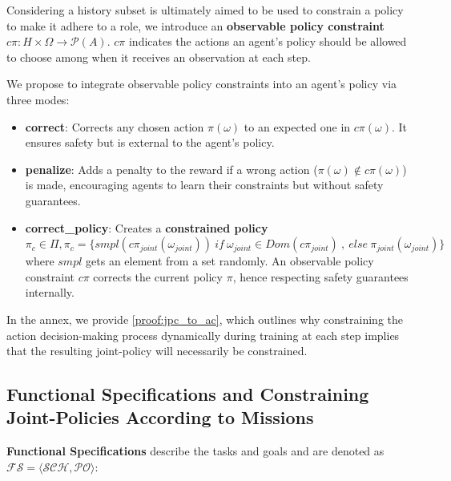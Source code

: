 \documentclass[runningheads]{llncs}
\theoremstyle{freethm}
\theoremstyle{proofoutline}
\newcounter{proof}
\begin{document}
Considering a history subset is ultimately aimed to be used to constrain a policy to make it adhere to a role, we introduce an \textbf{observable policy constraint} $c\pi: H \times \Omega \rightarrow \mathcal{P}(A)$. $c\pi$ indicates the actions an agent's policy should be allowed to choose among when it receives an observation at each step.

%     

We propose to integrate observable policy constraints into an agent's policy via three modes:

\begin{itemize}
    \item \textbf{correct}: Corrects any chosen action $\pi(\omega)$ to an expected one in $c\pi(\omega)$. It ensures safety but is external to the agent's policy.
    \item \textbf{penalize}: Adds a penalty to the reward if a wrong action ($\pi(\omega) \notin c\pi(\omega)$) is made, encouraging agents to learn their constraints but without safety guarantees.
    \item \textbf{correct\_policy}: Creates a \textbf{constrained policy} $\pi_c \in \Pi, \pi_c = \{smpl(c\pi_{joint}(\omega_{joint})) \ if \ \omega_{joint} \in Dom(c\pi_{joint}) \ \allowbreak, \ \allowbreak else \ \allowbreak \pi_{joint}(\omega_{joint})\}$ where $smpl$ gets an element from a set randomly. An observable policy constraint $c\pi$ corrects the current policy $\pi$, hence respecting safety guarantees internally.
\end{itemize}

In the annex, we provide \autoref{proof:jpc_to_ac}, which outlines why constraining the action decision-making process dynamically during training at each step implies that the resulting joint-policy will necessarily be constrained.


\subsection{Functional Specifications and Constraining Joint-Policies According to Missions}

\textbf{Functional Specifications} describe the tasks and goals and are denoted as $\mathcal{FS} = \langle \mathcal{SCH}, \mathcal{PO} \rangle$:
\end{document}
